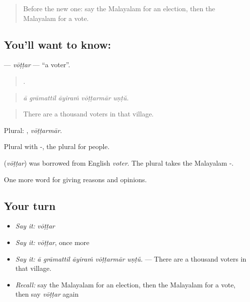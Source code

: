 \label{lesson:ML-C419-vottar}



\begin{quote}
Before the new one: say the Malayalam for an election, then the Malayalam for a vote.
\end{quote}

\subsection*{You'll want to know: }
\textbf{} — \emph{vōṭṭar} — \textquotedblleft{}a voter\textquotedblright{}.

\begin{quote}
    .
\end{quote}

\begin{quote}
\emph{ā grāmattil āyiraṁ vōṭṭarmār uṇṭŭ.}
\end{quote}

\begin{quote}
There are a thousand voters in that village.
\end{quote}

Plural: , \emph{vōṭṭarmār}.

Plural with -, the plural for people.

\begin{cousinweb}
\textbf{} (\emph{vōṭṭar}) was borrowed from English \emph{voter}. The plural takes the Malayalam -.
\end{cousinweb}

\begin{grammarlens}[title={What you've built}]
One more word for giving reasons and opinions.
\end{grammarlens}

\subsection*{Your turn}
\begin{itemize}
\raggedright
  \item \emph{Say it:} \emph{vōṭṭar}
  \item \emph{Say it:} \emph{vōṭṭar}, once more
  \item \emph{Say it:} \emph{ā grāmattil āyiraṁ vōṭṭarmār uṇṭŭ.} — There are a thousand voters in that village.
  \item \emph{Recall:} say the Malayalam for an election, then the Malayalam for a vote, then say \emph{vōṭṭar} again
\end{itemize}


